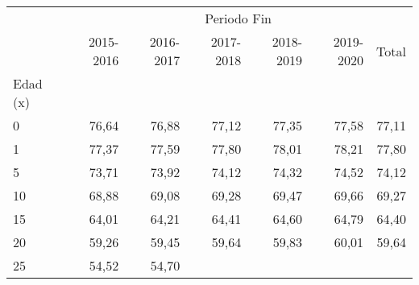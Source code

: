 \begin{tabular}{lllllll}
\cline{1-7}
\multicolumn{1}{c}{} &
  \multicolumn{6}{|c}{Periodo Fin} \\
\multicolumn{1}{c}{} &
  \multicolumn{1}{|r}{2015-2016} &
  \multicolumn{1}{r}{2016-2017} &
  \multicolumn{1}{r}{2017-2018} &
  \multicolumn{1}{r}{2018-2019} &
  \multicolumn{1}{r}{2019-2020} &
  \multicolumn{1}{r}{Total} \\
\cline{1-7}
\multicolumn{1}{l}{Edad (x)} &
  \multicolumn{1}{|r}{} &
  \multicolumn{1}{r}{} &
  \multicolumn{1}{r}{} &
  \multicolumn{1}{r}{} &
  \multicolumn{1}{r}{} &
  \multicolumn{1}{r}{} \\
\multicolumn{1}{l}{\hspace{1em}0} &
  \multicolumn{1}{|r}{76,64} &
  \multicolumn{1}{r}{76,88} &
  \multicolumn{1}{r}{77,12} &
  \multicolumn{1}{r}{77,35} &
  \multicolumn{1}{r}{77,58} &
  \multicolumn{1}{r}{77,11} \\
\multicolumn{1}{l}{\hspace{1em}1} &
  \multicolumn{1}{|r}{77,37} &
  \multicolumn{1}{r}{77,59} &
  \multicolumn{1}{r}{77,80} &
  \multicolumn{1}{r}{78,01} &
  \multicolumn{1}{r}{78,21} &
  \multicolumn{1}{r}{77,80} \\
\multicolumn{1}{l}{\hspace{1em}5} &
  \multicolumn{1}{|r}{73,71} &
  \multicolumn{1}{r}{73,92} &
  \multicolumn{1}{r}{74,12} &
  \multicolumn{1}{r}{74,32} &
  \multicolumn{1}{r}{74,52} &
  \multicolumn{1}{r}{74,12} \\
\multicolumn{1}{l}{\hspace{1em}10} &
  \multicolumn{1}{|r}{68,88} &
  \multicolumn{1}{r}{69,08} &
  \multicolumn{1}{r}{69,28} &
  \multicolumn{1}{r}{69,47} &
  \multicolumn{1}{r}{69,66} &
  \multicolumn{1}{r}{69,27} \\
\multicolumn{1}{l}{\hspace{1em}15} &
  \multicolumn{1}{|r}{64,01} &
  \multicolumn{1}{r}{64,21} &
  \multicolumn{1}{r}{64,41} &
  \multicolumn{1}{r}{64,60} &
  \multicolumn{1}{r}{64,79} &
  \multicolumn{1}{r}{64,40} \\
\multicolumn{1}{l}{\hspace{1em}20} &
  \multicolumn{1}{|r}{59,26} &
  \multicolumn{1}{r}{59,45} &
  \multicolumn{1}{r}{59,64} &
  \multicolumn{1}{r}{59,83} &
  \multicolumn{1}{r}{60,01} &
  \multicolumn{1}{r}{59,64} \\
\multicolumn{1}{l}{\hspace{1em}25} &
  \multicolumn{1}{|r}{54,52} &
  \multicolumn{1}{r}{54,70} &

\end{tabular}
